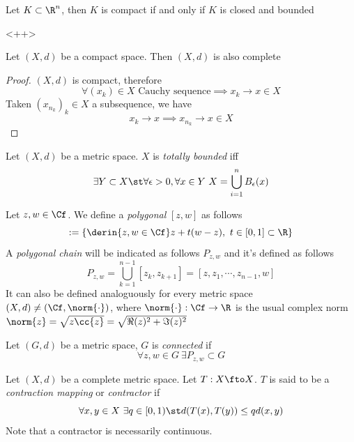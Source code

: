 \documentclass[../mmf.tex]{subfiles}
\begin{document}
\begin{thm}
	Let $K\subset\R^n$, then $K$ is compact if and only if $K$ is closed and bounded
\end{thm}<++>
\begin{thm}
	Let $(X,d)$ be a compact space. Then $(X,d)$ is also complete
\end{thm}
\begin{proof}
	$(X,d)$ is compact, therefore
	\begin{equation*}
		\forall(x_k)\in X\text{ Cauchy sequence}\implies{} x_k\to x\in X
	\end{equation*}
	Taken $(x_{n_k})_k\in X$ a subsequence, we have
	\begin{equation*}
		x_{k}\to x\implies{} x_{n_k}\to x\in X
	\end{equation*}
\end{proof}
\begin{dfn}
	Let $(X,d)$ be a metric space. $X$ is \textit{totally bounded} iff
	\begin{equation*}
		\exists Y\subset X\st\forall\epsilon>0,\forall x\in Y\ X=\bigcup_{i=1}^nB_\epsilon(x)
	\end{equation*}
\end{dfn}
\begin{dfn}
	Let $z,w\in\Cf$. We define a \textit{polygonal} $[z,w]$ as follows
	\begin{equation*}
		[z,w]:=\{\derin{z,w\in\Cf}z+t(w-z),\ t\in[0,1]\subset\R\}
	\end{equation*}
	A \textit{polygonal chain} will be indicated as follows $P_{z,w}$ and it's defined as follows
	\begin{equation*}
		P_{z,w}=\bigcup_{k=1}^{n-1}[z_k,z_{k+1}]=[z,z_1,\cdots,z_{n-1},w]
	\end{equation*}
	It can also be defined analoguously for every metric space $(X,d)\ne(\Cf,\norm{\cdot})$, where $\norm{\cdot}:\Cf\to\R$ is the usual complex norm $\norm{z}=\sqrt{z\cc{z}}=\sqrt{\Re(z)^2+\Im(z)^2}$
\end{dfn}
\begin{dfn}
	Let $(G,d)$ be a metric space, $G$ is \textit{connected} if
	\begin{equation*}
		\forall z,w\in G\ \exists P_{z,w}\subset G
	\end{equation*}
\end{dfn}
\begin{dfn}
	Let $(X,d)$ be a complete metric space. Let $T:X\fto X$. $T$ is said to be a \textit{contraction mapping} or \textit{contractor} if
	\begin{equation}
		\forall x,y\in X\ \exists q\in[0,1)\st d(T(x),T(y))\le qd(x,y)
		\label{eq:contractor}
	\end{equation}
	Note that a contractor is necessarily continuous.
\end{dfn}
\end{document}
